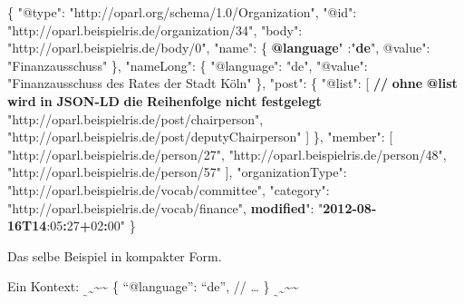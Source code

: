 \documentclass[,a4paper]{article}
\newenvironment{Shaded}{}{}
\newcommand{\DataTypeTok}[1]{\textcolor[rgb]{0.56,0.13,0.00}{{#1}}}
\newcommand{\DecValTok}[1]{\textcolor[rgb]{0.25,0.63,0.44}{{#1}}}
\newcommand{\StringTok}[1]{\textcolor[rgb]{0.25,0.44,0.63}{{#1}}}
\newcommand{\ErrorTok}[1]{\textcolor[rgb]{1.00,0.00,0.00}{\textbf{{#1}}}}
\newcommand{\NormalTok}[1]{{#1}}
\begin{document}
\begin{Shaded}
\begin{Highlighting}[]
\NormalTok{\{}
    \DataTypeTok{"@type"}\NormalTok{: }\StringTok{"http://oparl.org/schema/1.0/Organization"}\NormalTok{,}
    \DataTypeTok{"@id"}\NormalTok{: }\StringTok{"http://oparl.beispielris.de/organization/34"}\NormalTok{,}
    \DataTypeTok{"body"}\NormalTok{: }\StringTok{"http://oparl.beispielris.de/body/0"}\NormalTok{,}
    \DataTypeTok{"name"}\NormalTok{: \{}
        \ErrorTok{@language}\DataTypeTok{" :"}\ErrorTok{de}\DataTypeTok{",}
\DataTypeTok{        @value"}\NormalTok{: }\StringTok{"Finanzausschuss"}
    \NormalTok{\},}
    \DataTypeTok{"nameLong"}\NormalTok{: \{}
        \DataTypeTok{"@language"}\NormalTok{: }\StringTok{"de"}\NormalTok{,}
        \DataTypeTok{"@value"}\NormalTok{: }\StringTok{"Finanzausschuss des Rates der Stadt Köln"}
    \NormalTok{\},}
    \DataTypeTok{"post"}\NormalTok{: \{}
        \DataTypeTok{"@list"}\NormalTok{: [}
        \ErrorTok{//} \ErrorTok{ohne} \ErrorTok{@list} \ErrorTok{wird} \ErrorTok{in} \ErrorTok{JSON-LD} \ErrorTok{die} \ErrorTok{Reihenfolge} \ErrorTok{nicht} \ErrorTok{festgelegt}
        \StringTok{"http://oparl.beispielris.de/post/chairperson"}\NormalTok{,}
        \StringTok{"http://oparl.beispielris.de/post/deputyChairperson"}
        \NormalTok{]}
    \NormalTok{\},}
    \DataTypeTok{"member"}\NormalTok{: [}
        \StringTok{"http://oparl.beispielris.de/person/27"}\NormalTok{,}
        \StringTok{"http://oparl.beispielris.de/person/48"}\NormalTok{,}
        \StringTok{"http://oparl.beispielris.de/person/57"}
    \NormalTok{],}
    \DataTypeTok{"organizationType"}\NormalTok{: }\StringTok{"http://oparl.beispielris.de/vocab/committee"}\NormalTok{,}
    \DataTypeTok{"category"}\NormalTok{: }\StringTok{"http://oparl.beispielris.de/vocab/finance"}\NormalTok{,}
    \ErrorTok{modified}\DataTypeTok{": "}\ErrorTok{2012-08-16T14}\NormalTok{:}\DecValTok{05}\ErrorTok{:}\DecValTok{27}\ErrorTok{+}\DecValTok{02}\ErrorTok{:}\DecValTok{00}\StringTok{"}
\StringTok{\}}
\end{Highlighting}
\end{Shaded}

Das selbe Beispiel in kompakter Form.

Ein Kontext:
\textsubscript{\textsubscript{\textasciitilde{}}\textasciitilde{}}\textasciitilde{}\textasciitilde{}
\{ ``@language'': ``de'', // \ldots{} \}
\textsubscript{\textsubscript{\textasciitilde{}}\textasciitilde{}}\textasciitilde{}\textasciitilde{}
\end{document}
